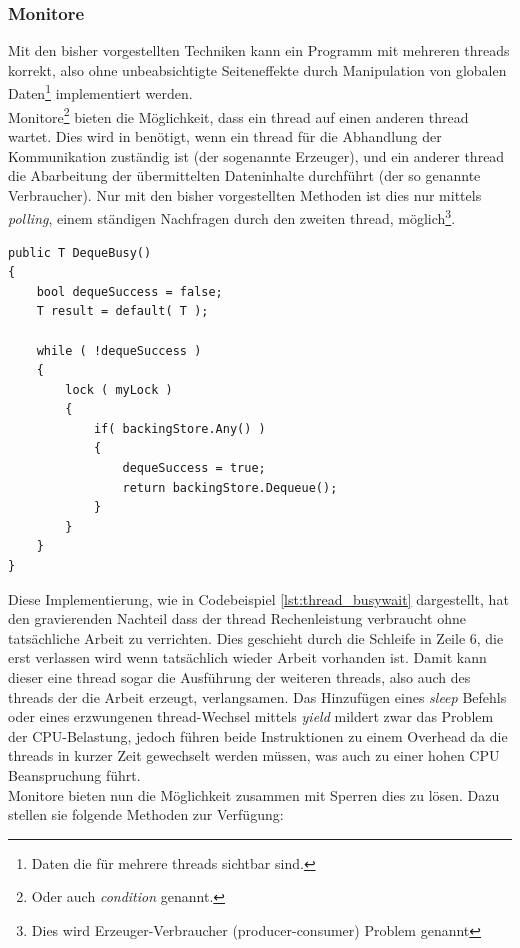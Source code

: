 \subsubsection{Monitore}	
Mit den bisher vorgestellten Techniken kann ein Programm mit mehreren threads korrekt, also ohne unbeabsichtigte Seiteneffekte durch Manipulation von globalen Daten\footnote{Daten die für mehrere threads sichtbar sind.}  implementiert werden. 
\\Monitore\footnote{Oder auch \textit{condition} genannt\cite[S. 199]{Dahlin2012}.} bieten die Möglichkeit, dass ein thread auf einen anderen thread wartet. Dies wird in benötigt, wenn ein thread für die Abhandlung der Kommunikation zuständig ist (der sogenannte Erzeuger), und ein anderer thread die Abarbeitung der übermittelten Dateninhalte durchführt (der so genannte Verbraucher). Nur mit den bisher vorgestellten Methoden ist dies nur mittels \textit{polling}, einem ständigen Nachfragen durch den zweiten thread, möglich\footnote{Dies wird Erzeuger-Verbraucher (producer-consumer) Problem genannt\cite[S. 188]{tanenbaum2016}}\cite[S. 199ff]{Dahlin2012}. 
\begin{lstlisting}[caption={Thread naiver Monitor},label={lst:thread_busywait},captionpos=b]
public T DequeBusy()
{
	bool dequeSuccess = false;
	T result = default( T );

	while ( !dequeSuccess )
	{
		lock ( myLock )
		{
			if( backingStore.Any() )
			{
				dequeSuccess = true;
				return backingStore.Dequeue();
			}
		}
	}
}

\end{lstlisting}
Diese Implementierung, wie in Codebeispiel \ref{lst:thread_busywait} dargestellt, hat den gravierenden Nachteil dass der thread Rechenleistung verbraucht ohne tatsächliche Arbeit zu verrichten. Dies geschieht durch die Schleife in Zeile 6, die erst verlassen wird wenn tatsächlich wieder Arbeit vorhanden ist. Damit kann dieser eine thread sogar die Ausführung der weiteren threads, also auch des threads der die Arbeit erzeugt, verlangsamen. Das Hinzufügen eines \textit{sleep} Befehls oder eines erzwungenen thread-Wechsel mittels \textit{yield} mildert zwar das Problem der CPU-Belastung, jedoch führen beide Instruktionen zu einem Overhead da die threads in kurzer Zeit gewechselt werden müssen, was auch zu einer hohen CPU Beanspruchung führt.
\\Monitore bieten nun die Möglichkeit zusammen mit Sperren dies zu lösen. Dazu stellen sie folgende Methoden zur Verfügung:\cite[S. 201]{Dahlin2012}\cite{ms_monitor}
